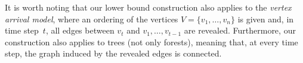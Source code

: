 \documentclass[a4paper,USenglish,cleveref,autoref,thm-restate,pdfa]{lipics-v2021}
\begin{document}
\begin{remark}
It is worth noting that our lower bound construction also applies to the \emph{vertex arrival model}, where an ordering of the vertices $V=\{v_1, \dots, v_n\}$ is given and, in time step~$t$, all edges between $v_t$ and $v_1, \ldots, v_{t-1}$ are revealed.
Furthermore, our construction also applies to trees (not only forests), meaning that, at every time step, the graph induced by the revealed edges is connected.
\end{remark}


\end{document}
